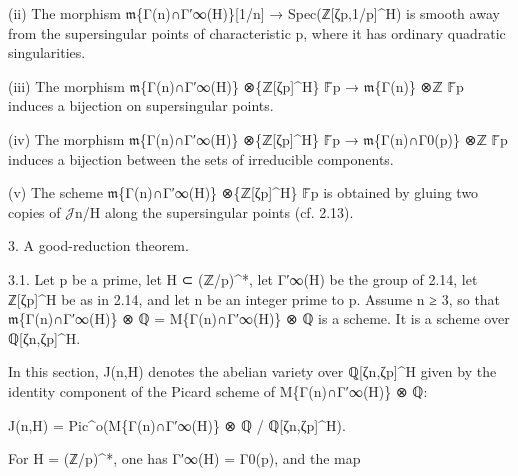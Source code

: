 \documentclass[11pt,a4paper]{article}
\begin{document}
(ii)        The morphism \ensuremath{\mathfrak{m}}\textunderscore{}\{Γ(n)∩Γ′\textunderscore{}∞(H)\}[1/n] → Spec(ℤ[ζ\textunderscore{}p,1/p]\textasciicircum{}H) is smooth away from the supersingular points of characteristic p, where it has ordinary quadratic singularities.

(iii)        The morphism \ensuremath{\mathfrak{m}}\textunderscore{}\{Γ(n)∩Γ′\textunderscore{}∞(H)\} ⊗\textunderscore{}\{ℤ[ζ\textunderscore{}p]\textasciicircum{}H\} \ensuremath{\mathbb{F}}̄\textunderscore{}p → \ensuremath{\mathfrak{m}}\textunderscore{}\{Γ(n)\} ⊗\textunderscore{}ℤ \ensuremath{\mathbb{F}}̄\textunderscore{}p induces a bijection on supersingular points.

(iv)        The morphism \ensuremath{\mathfrak{m}}\textunderscore{}\{Γ(n)∩Γ′\textunderscore{}∞(H)\} ⊗\textunderscore{}\{ℤ[ζ\textunderscore{}p]\textasciicircum{}H\} \ensuremath{\mathbb{F}}̄\textunderscore{}p → \ensuremath{\mathfrak{m}}\textunderscore{}\{Γ(n)∩Γ\textunderscore{}0(p)\} ⊗\textunderscore{}ℤ \ensuremath{\mathbb{F}}̄\textunderscore{}p induces a bijection between the sets of irreducible components.

(v)        The scheme \ensuremath{\mathfrak{m}}\textunderscore{}\{Γ(n)∩Γ′\textunderscore{}∞(H)\} ⊗\textunderscore{}\{ℤ[ζ\textunderscore{}p]\textasciicircum{}H\} \ensuremath{\mathbb{F}}̄\textunderscore{}p is obtained by gluing two copies of \ensuremath{\mathcal{J}}\textunderscore{}n/H along the supersingular points (cf. 2.13).

3. A good-reduction theorem.

3.1. Let p be a prime, let H ⊂ (ℤ/p)\textasciicircum{}*, let Γ′\textunderscore{}∞(H) be the group of 2.14, let ℤ[ζ\textunderscore{}p]\textasciicircum{}H be as in 2.14, and let n be an integer prime to p. Assume n ≥ 3, so that \ensuremath{\mathfrak{m}}\textunderscore{}\{Γ(n)∩Γ′\textunderscore{}∞(H)\} ⊗ ℚ = M\textunderscore{}\{Γ(n)∩Γ′\textunderscore{}∞(H)\} ⊗ ℚ is a scheme. It is a scheme over ℚ[ζ\textunderscore{}n,ζ\textunderscore{}p]\textasciicircum{}H.

In this section, J(n,H) denotes the abelian variety over ℚ[ζ\textunderscore{}n,ζ\textunderscore{}p]\textasciicircum{}H given by the identity component of the Picard scheme of M\textunderscore{}\{Γ(n)∩Γ′\textunderscore{}∞(H)\} ⊗ ℚ:

J(n,H) = Pic\textasciicircum{}o(M\textunderscore{}\{Γ(n)∩Γ′\textunderscore{}∞(H)\} ⊗ ℚ / ℚ[ζ\textunderscore{}n,ζ\textunderscore{}p]\textasciicircum{}H).

For H = (ℤ/p)\textasciicircum{}*, one has Γ′\textunderscore{}∞(H) = Γ\textunderscore{}0(p), and the map
\end{document}
